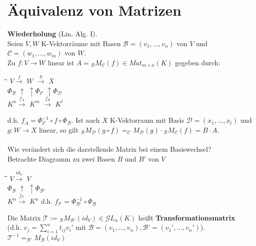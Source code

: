 \documentclass[a4paper,twoside]{article}
\begin{document}
\section{Äquivalenz von Matrizen}
\textbf{Wiederholung} (Lin. Alg. I).\\ Seien $V, W$ K-Vektorräume mit Basen $\mathcal{B} = (v_1, \dots, v_n)$ von $V$ und $\mathcal{C} = (w_1, \dots, w_m)$ von $W$. \\
Zu $f: V \longrightarrow W$ linear ist $A = {_\mathcal B}M_\mathcal{C}(f) \in Mat_{m\times n}(K)$ gegeben durch:\\
\begin{tabbing}
	\hspace{15pt}\=\hspace{40pt}\=\hspace{40pt}\= \kill
	\>$V \xrightarrow f$ \>$W$ $\xrightarrow g$ \>$X$\\
	$\Phi{_\mathcal B}$ \>$\uparrow$ \>$\uparrow \Phi_\mathcal{C}$ \>$\uparrow \Phi_\mathcal{D}$\\
	\>$K^n \xrightarrow{f_A}$ \>$K^m$ $\xrightarrow{f_B}$ \>$K^l$\\
\end{tabbing}
d.h. $f_A = \Phi_\mathcal{C}^{-1}\circ f \circ \Phi{_\mathcal B}$. Ist auch $X$ K-Vektorraum mit Basis $\mathcal{D} = (x_1, \dots, x_l)$ und $g: W \longrightarrow X$ linear, so gilt ${_\mathcal B}M_\mathcal{D}(g \circ f) = _\mathcal{C}M_\mathcal{D}(g) \cdot {_\mathcal B}M_\mathcal{C}(f) = B \cdot A$.\\ \\
Wie verändert sich die darstellende Matrix bei einem Basiswechsel?\\
Betrachte Diagramm zu zwei Basen $B$ und $B'$ von $V$\\
\begin{tabbing}
	\hspace{15pt}\=\hspace{40pt}\=\hspace{2cm}\= \kill
	\>$V \xrightarrow{id_V}$ \>$V$\\
	$\Phi{_\mathcal B}$ \>$\uparrow$ \>$\uparrow \Phi_\mathcal{B'}$\\
	\>$K^n \xrightarrow{f_\mathcal{T}}$ \>$K^n$ \>d.h. $f_\mathcal{T} = \Phi_\mathcal{B'}^{-1} \circ \Phi{_\mathcal B}$\\
\end{tabbing}
Die Matrix $\mathcal{T} := {_\mathcal B}M_\mathcal{B'}(id_V) \in \mathcal{G}L_n(K)$ heißt \textbf{Transformationsmatrix}\\
(d.h. $v_j = \sum_{i=1}^{n} t_{ij} v_i'$ mit $\mathcal{B} = (v_1, \dots, v_n), \mathcal{B'} = (v_1', \dots, v_n')$). $\mathcal{T}^{-1} = _\mathcal{B'}M{_\mathcal B}(id_V)$\\
\end{document}
